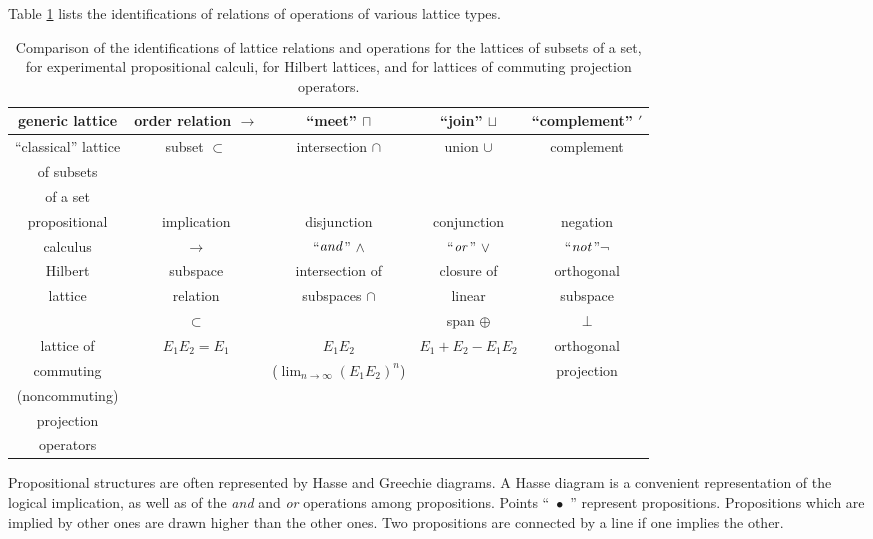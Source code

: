 \documentclass[%
  preprint,
 showpacs,
 showkeys,
 preprintnumbers,
 amsmath,amssymb,
 aps,
 rmp,
  longbibliography,
 ]{revtex4-1}
\begin{document}
Table
 \ref{tcompa} lists the identifications of relations of operations of
various lattice types.
\begin{table}[h]
\begin{center}
{\footnotesize
 \begin{tabular}{ccccc} \hline\hline
 generic lattice  &  order relation $\rightarrow $  & ``meet'' $\sqcap$
&
``join''
$\sqcup$ & ``complement'' $'$\\
\hline
``classical'' lattice  &  subset $\subset $  & intersection $\cap$ &
union
$\cup$ & complement\\
of subsets&&&&\\
of a set&&&&\\
\hline
propositional&implication&disjunction&conjunction&negation\\
calculus&$\rightarrow$&``${\it and}$'' $\wedge$&``${\it or}$''
$\vee$&``${\it not}$''$\neg$\\
\hline
Hilbert & subspace& intersection of & closure of     & orthogonal \\
lattice & relation& subspaces $\cap$&  linear& subspace   \\
        & $\subset$ &                 & span $\oplus$  &  $\perp$   \\
\hline
lattice of& $E_1E_2=E_1$& $E_1E_2$&
                               $E_1+E_2-E_1E_2$& orthogonal\\
commuting&&($\lim_{n\rightarrow \infty}(E_1E_2)^n$)&&projection\\
(noncommuting)\\
projection\\
operators\\
 \hline\hline
 \end{tabular}
}
 \caption{Comparison of the identifications of lattice relations and
 operations for the lattices of subsets of a set, for
 experimental propositional calculi, for  Hilbert lattices, and for
lattices of commuting projection operators.
 \label{tcompa}}
 \end{center} \end{table}

Propositional structures are often represented by Hasse and Greechie
diagrams.
A Hasse diagram is a convenient representation of the
logical implication,
as well as of the {\it and} and {\it or}
operations
among propositions.
 Points
``~$\bullet$~'' represent propositions. Propositions
which are implied by other ones are drawn higher than the other ones.
Two propositions are connected by a line if one implies the other.
\end{document}
